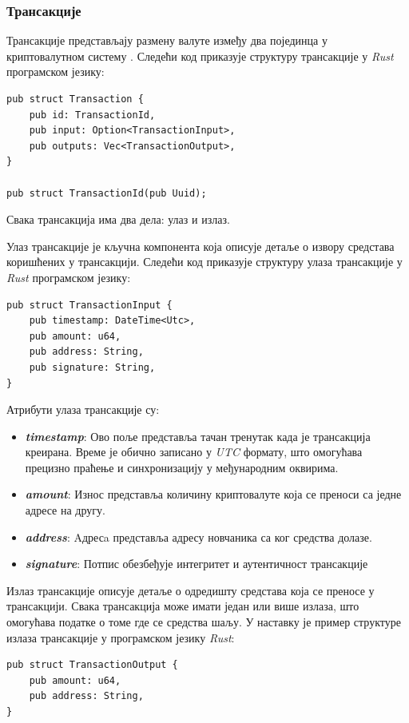 \documentclass[12pt, a4paper]{article}
\begin{document}
\subsubsection{Трансакције}
Трансакције представљају размену валуте између два појединца у криптовалутном систему \cite{12}.  Следећи код приказује структуру трансакције у \textit{Rust} програмском језику:

\begin{verbatim}
pub struct Transaction {
    pub id: TransactionId,
    pub input: Option<TransactionInput>,
    pub outputs: Vec<TransactionOutput>,
}

pub struct TransactionId(pub Uuid);

\end{verbatim}

Свака трансакција има два дела: улаз и излаз. 

Улаз трансакције је кључна компонента која описује детаље о извору средстава коришћених у трансакцији. Следећи код приказује структуру улаза трансакције у \textit{Rust} програмском језику:
\begin{verbatim}
pub struct TransactionInput {
    pub timestamp: DateTime<Utc>,
    pub amount: u64,
    pub address: String,
    pub signature: String,
}
\end{verbatim}

Атрибути улаза трансакције су:
\begin{itemize}
    \item \textbf{\textit{timestamp}}: Ово поље представља тачан тренутак када је трансакција креирана. Време је обично записано у \textit{UTC} формату, што омогућава прецизно праћење и синхронизацију у међународним оквирима.
    \item \textbf{\textit{amount}}: Износ представља количину криптовалуте која се преноси са једне адресе на другу. 
    \item \textbf{\textit{address}}: Aдресa представља адресу новчаника са ког средства долазе.
    \item \textbf{\textit{signature}}: Потпис обезбеђује интегритет и аутентичност трансакције
\end{itemize}

Излаз трансакције описује детаље о одредишту средстава која се преносе у трансакцији. Свака трансакција може имати један или више излаза, што омогућава податке о томе где се средства шаљу. У наставку је пример структуре излаза трансакције у програмском језику \textit{Rust}:

\begin{verbatim}
pub struct TransactionOutput {
    pub amount: u64,
    pub address: String,
}
\end{verbatim}
\end{document}
